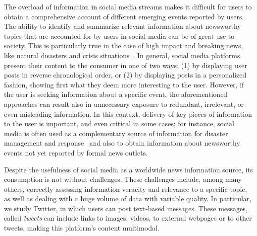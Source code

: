 The overload of information in social media streams makes it difficult for users
to obtain a comprehensive account of different emerging events reported by
users.
%
%
The ability to identify and summarize relevant information about newsworthy
topics that are accounted for by users in social media can be of great use to
society.
%
This is particularly true in the case of high impact and breaking news, like
natural disasters and crisis situations~\cite{ICWSM1817816}.
%
In general, social media platforms present their content to the consumer in one
of two ways: (1) by displaying user posts in reverse chronological order, or (2)
by displaying posts in a personalized fashion, showing first what they deem more
interesting to the user.
%
However, if the user 
is seeking information about a specific event, the aforementioned approaches can
result also in unnecessary exposure to redundant, irrelevant, or even misleading
information.
%
In this context, delivery of key pieces of information to the user is important,
and even critical in some cases; 
%
for instance, social media is often used as a complementary source of
information for disaster management and
response~\cite{ICWSM1817816,Sarmiento:2018:DDE:3201064.3201077}
and also to obtain information about newsworthy events not yet reported by
formal news outlets. 
%
%

Despite the usefulness of social media as a worldwide news information source,
its consumption is not without challenges.
%
These challenges include, among many others, correctly assessing information
veracity and relevance to a specific topic, as well as dealing with a huge
volume of data with variable quality. 
%
%
%
%
In particular, we study Twitter, in which users can post text-based messages.
%
These messages, called {\em tweets} can include links to images, videos, to
external webpages or to other tweets, making this platform's content multimodal.

